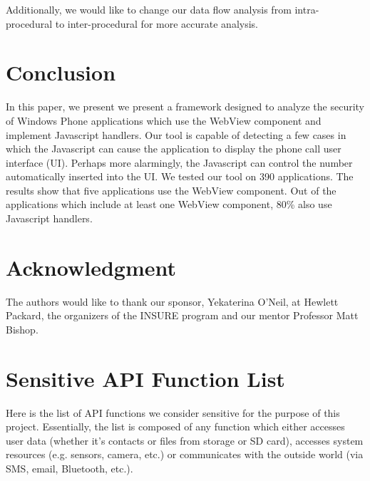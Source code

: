 \documentclass[conference]{IEEEtran}
\begin{document}
Additionally, we would like to change our data flow analysis from intra-procedural to inter-procedural for more accurate analysis.

\section{Conclusion}
In this paper, we present we present a framework designed to analyze the security of Windows Phone applications which use the WebView component and implement Javascript handlers. Our tool is capable of detecting a few cases in which the Javascript can cause the application to display the phone call user interface (UI). Perhaps more alarmingly, the Javascript can control the number automatically inserted into the UI. We tested our tool on 390 applications. The results show that five applications use the WebView component. Out of the applications which include at least one WebView component, 80\% also use Javascript handlers.

\section*{Acknowledgment}
The authors would like to thank our sponsor, Yekaterina O'Neil, at Hewlett Packard, the organizers of the INSURE program and our mentor Professor Matt Bishop.




\appendix
\section{Sensitive API Function List}
Here is the list of API functions we consider sensitive for the purpose of this project.
Essentially, the list is composed of any function which either accesses user data (whether it's contacts or files from storage or SD card), accesses system resources (e.g. sensors, camera, etc.) or communicates with the outside world (via SMS, email, Bluetooth, etc.).

\end{document}
